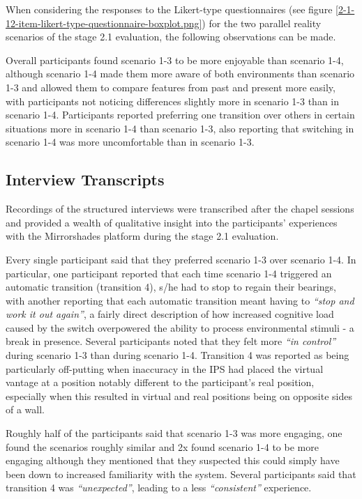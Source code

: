 When considering the responses to the Likert-type questionnaires (see figure \ref{2-1-12-item-likert-type-questionnaire-boxplot.png}) for the two parallel reality scenarios of the stage 2.1 evaluation, the following observations can be made.

Overall participants found scenario 1-3 to be more enjoyable than scenario 1-4, although scenario 1-4 made them more aware of both environments than scenario 1-3 and allowed them to compare features from past and present more easily, with participants not noticing differences slightly more in scenario 1-3 than in scenario 1-4. Participants reported preferring one transition over others in certain situations more in scenario 1-4 than scenario 1-3, also reporting that switching in scenario 1-4 was more uncomfortable than in scenario 1-3.


\subsection{Interview Transcripts}

Recordings of the structured interviews were transcribed after the chapel sessions and provided a wealth of qualitative insight into the participants' experiences with the Mirrorshades platform during the stage 2.1 evaluation.

Every single participant said that they preferred scenario 1-3 over scenario 1-4. In particular, one participant  reported that each time scenario 1-4 triggered an automatic transition (transition 4), s/he had to stop to regain their bearings, with another reporting that each automatic transition meant having to \textit{``stop and work it out again''}, a fairly direct description of how increased cognitive load caused by the switch overpowered the ability to process environmental stimuli - a break in presence. Several participants noted that they felt more \textit{``in control''} during scenario 1-3 than during scenario 1-4. Transition 4 was reported as being particularly off-putting when inaccuracy in the IPS had placed the virtual vantage at a position notably different to the participant's real position, especially when this resulted in virtual and real positions being on opposite sides of a wall.

Roughly half of the participants said that scenario 1-3 was more engaging, one found the scenarios roughly similar and 2x found scenario 1-4 to be more engaging although they mentioned that they suspected this could simply have been down to increased familiarity with the system. Several participants said that transition 4 was \textit{``unexpected''}, leading to a less \textit{``consistent''} experience.

